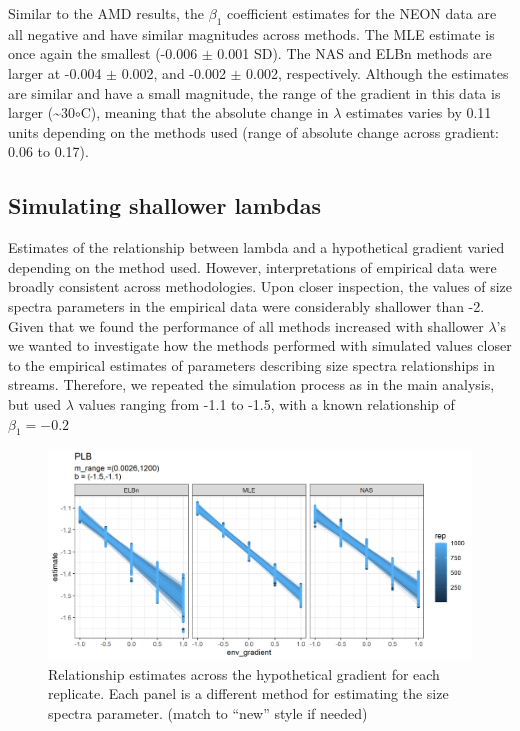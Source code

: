 \documentclass[
]{article}
\begin{document}
Similar to the AMD results, the \(\beta_1\) coefficient estimates for
the NEON data are all negative and have similar magnitudes across
methods. The MLE estimate is once again the smallest (-0.006 \(\pm\)
0.001 SD). The NAS and ELBn methods are larger at -0.004 \(\pm\) 0.002,
and -0.002 \(\pm\) 0.002, respectively. Although the estimates are
similar and have a small magnitude, the range of the gradient in this
data is larger (\textasciitilde30\(\circ\)C), meaning that the absolute
change in \(\lambda\) estimates varies by 0.11 units depending on the
methods used (range of absolute change across gradient: 0.06 to 0.17).

\hypertarget{simulating-shallower-lambdas}{%
\subsection{Simulating shallower
lambdas}\label{simulating-shallower-lambdas}}

Estimates of the relationship between lambda and a hypothetical gradient
varied depending on the method used. However, interpretations of
empirical data were broadly consistent across methodologies. Upon closer
inspection, the values of size spectra parameters in the empirical data
were considerably shallower than -2. Given that we found the performance
of all methods increased with shallower \(\lambda\)'s we wanted to
investigate how the methods performed with simulated values closer to
the empirical estimates of parameters describing size spectra
relationships in streams. Therefore, we repeated the simulation process
as in the main analysis, but used \(\lambda\) values ranging from -1.1
to -1.5, with a known relationship of \(\beta_1 = -0.2\)

\newpage

\begin{figure}
\centering
\includegraphics{figures/shallow_lambda_main.png}
\caption{Relationship estimates across the hypothetical gradient for
each replicate. Each panel is a different method for estimating the size
spectra parameter. (match to ``new'' style if needed)}
\end{figure}
\end{document}
